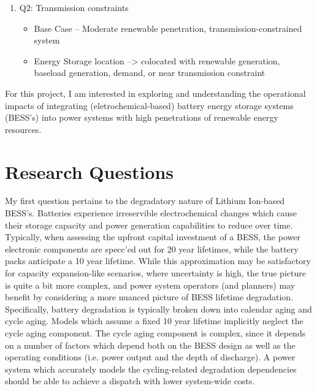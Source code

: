 \documentclass{homework}
\begin{document}
\begin{enumerate}
\begin{letterenum}
\begin{enumerate}
\begin{itemize}
            \item Energy Storage sizing
            \item Cost sensitivities -- Lithium prices (low, mid, high)
            \end{itemize}
        \item Q2: Transmission constraints
            \begin{itemize}
            \item Base Case -- Moderate renewable penetration, transmission-constrained system
            \item Energy Storage location --> colocated with renewable generation, baseload generation, demand, or near transmission constraint
            \end{itemize}
        \end{enumerate}
    \end{letterenum}
\end{enumerate}

For this project, I am interested in exploring and understanding the operational impacts of integrating (eletrochemical-based) battery energy storage systems (BESS's) into power systems with high penetrations
of renewable energy resources. 

\section{Research Questions}

My first question pertains to the degradatory nature of Lithium Ion-based BESS's. Batteries experience irreservible electrochemical changes which cause their storage capacity and power generation
capabilities to reduce over time.  Typically, when assessing the upfront capital investment of a BESS, the power electronic components are specc'ed out for 20 year lifetimes, while the
battery packs anticipate a 10 year lifetime. While this approximation may be satisfactory for capacity expansion-like scenarios, where uncertainty is high, the true picture is quite
a bit more complex, and power system operators (and planners) may benefit by considering a more nuanced picture of BESS lifetime degradation. Specifically, battery degradation is typically
broken down into calendar aging and cycle aging. Models which assume a fixed 10 year lifetime implicitly neglect the cycle aging component. The cycle aging component is complex, since
it depends on a number of factors which depend both on the BESS design as well as the operating conditions (i.e. power output and the depth of discharge). A power system which accurately
models the cycling-related degradation dependencies should be able to achieve a dispatch with lower system-wide costs. 
\end{document}
